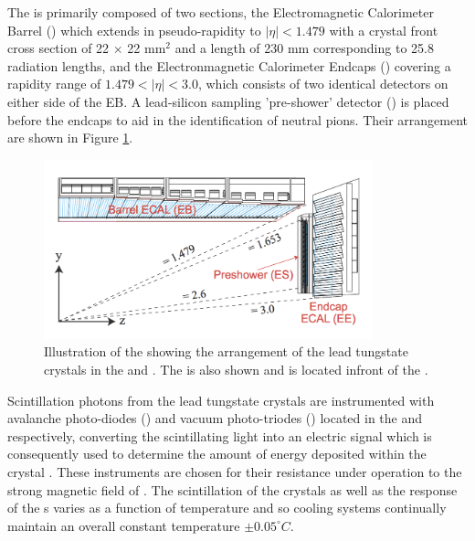  The  \ECAL is primarily composed of two sections, the Electromagnetic Calorimeter Barrel (\EB) which extends in pseudo-rapidity to $\lvert\eta\rvert < 1.479$ with a crystal front cross section of 22 $\times$ 22 mm$^{2}$ and a length of 230 mm corresponding to 25.8 radiation lengths, and the Electronmagnetic Calorimeter Endcaps (\EE) covering a rapidity range of $1.479 < \lvert\eta\rvert < 3.0 $, which consists of two identical detectors
on either side of the EB.  A lead-silicon sampling 'pre-shower' detector (\ES) is placed before the endcaps to aid in the identification of neutral pions. Their arrangement are shown in Figure \ref{fig:cms-ecal}. \\

 
 \begin{figure}[!h]

\centering
\includegraphics[width=0.85\textwidth]{plots/cms-ecal.png}
\caption[Illustration of the \CMS \ECAL showing the arrangement of the lead tungstate crystals in the \EB and \EE. The \ES is also shown and is located infront of the \EE.]{Illustration of the \CMS \ECAL showing the arrangement of the lead tungstate crystals in the \EB and \EE. The \ES is also shown and is located infront of the \EE \cite{CMS_ECAL_TDR}.}  
\label{fig:cms-ecal}
\end{figure}


Scintillation photons from the lead tungstate crystals are instrumented with avalanche photo-diodes (\APD) and vacuum photo-triodes (\VPT) located in the \EB and \EE respectively, converting the scintillating light into an electric signal which is consequently used to determine the amount of energy deposited within the crystal . These instruments are chosen for their resistance under operation to the strong magnetic field of \CMS. The scintillation of the \ECAL crystals as well as the response of the \APD s varies as a function of temperature and so cooling systems continually maintain an overall constant \ECAL temperature $\pm 0.05 ^{\circ}C$.
 


